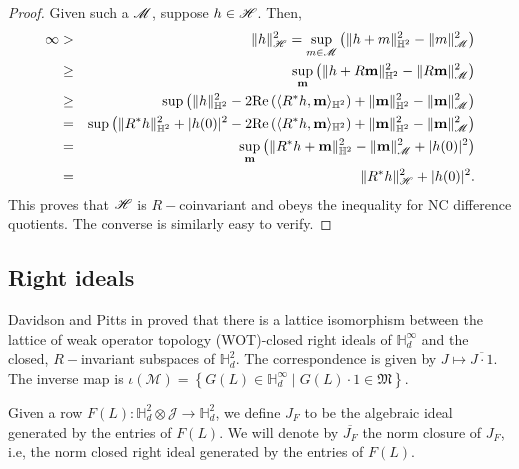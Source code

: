 \documentclass[11pt]{article}
\newcommand{\ba}{\begin{eqnarray}}
\newcommand{\ea}{\end{eqnarray}}
\newcommand{\nn}{\nonumber}
\newcommand{\scr}{\ensuremath{\mathscr}}
\newcommand{\mbf}{\ensuremath{\mathbf}}
\def\bH{\mathbb{H}}
\def\hardy{\mathbb{H} ^2 _d}
\def\mult{\mathbb{H} ^\infty _d}
\newcommand{\J}{\ensuremath{\mathcal{J} }}
\newcommand{\M}{\ensuremath{\mathfrak{M} }}
\newcommand{\ip}[2]{\ensuremath{\langle {#1} , {#2} \rangle}}
\newcommand{\re}[1]{\ensuremath{\mathrm{Re} \left( {#1} \right) }}
\newcommand{\sM}{\ensuremath{\mathscr{M}}}
\numberwithin{equation}{section}
\numberwithin{subsection}{section}
\theoremstyle{definition}
\begin{document}
\begin{proof}
    Given such a $\scr{M}$, suppose $h \in \scr{H}$. Then,
\ba \infty & > & \| h \| ^2 _{\scr{H}} = \sup _{m \in \scr{M}} \left( \| h + m \| ^2 _{\bH ^2} - \| m \| ^2 _\scr{M} \right) \nn \\
& \geq & \sup _{\mbf{m}} \left( \| h + R \mbf{m} \| ^2 _{\bH ^2} - \| R \mbf{m} \| ^2 _{\scr{M}} \right) \nn \\
& \geq & \sup \left( \| h \| ^2 _{\bH ^2}   - 2 \re{\ip{R^* h}{\mbf{m}} _{\bH ^2}} + \| \mbf{m} \| ^2 _{\bH ^2} - \| \mbf{m} \| ^2 _\scr{M} \right) \nn \\
& = & \sup \left( \| R^* h \| ^2 _{\bH ^2} + | h(0) | ^2 - 2\re{\ip{R^*h}{\mbf{m}}_{\bH ^2}} + \| \mbf{m} \| ^2 _{\bH ^2} - \| \mbf{m} \| ^2 _\scr{M} \right) \nn \\ 
& = & \sup _\mbf{m} \left( \| R^* h + \mbf{m} \| ^2 _{\bH ^2} - \| \mbf{m} \| _\scr{M} ^2 + | h (0) | ^2 \right) \nn \\
& = & \| R^* h \| ^2 _{\scr{H}} + |h (0) | ^2. \nn \ea 
This proves that $\scr{H}$ is $R-$coinvariant and obeys the inequality for NC difference quotients. The converse is similarly easy to verify. 
\end{proof}



\subsection*{Right ideals}

Davidson and Pitts in \cite{DP-alg} proved that there is a lattice isomorphism between the lattice of weak operator topology (WOT)-closed right ideals of $\mult$ and the closed, $R-$invariant subspaces of $\hardy$. The correspondence is given by $J \mapsto \overline{J \cdot 1}$. The inverse map is $\iota(\sM) = \left\{ G(L) \in \mult \mid G(L) \cdot 1 \in \M \right\}$. 

Given a row $F(L) \colon \bH ^2_d \otimes \J \to \bH ^2_d$, we define $J_F$ to be the algebraic ideal generated by the entries of $F(L)$. We will denote by $\overline{J_F}$ the norm closure of $J_F$, i.e, the norm closed right ideal generated by the entries of $F(L)$.
\end{document}
